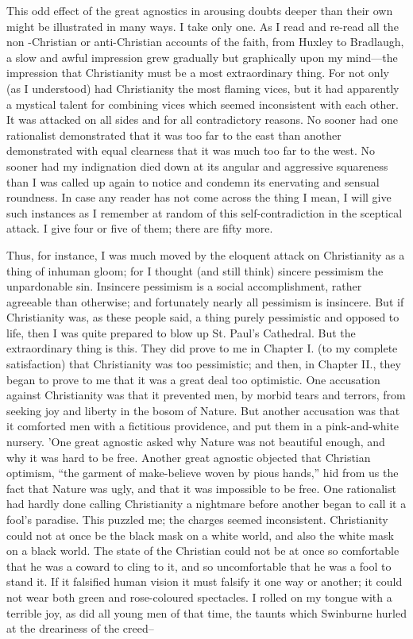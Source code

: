 \documentclass{book}
\begin{document}
This odd effect of the great agnostics in arousing doubts deeper than their own might be illustrated in many ways. I take only one. As I read and re-read all the non -Christian or anti-Christian accounts of the faith, from Huxley to Bradlaugh, a slow and awful impression grew gradually but graphically upon my mind—the impression that Christianity must be a most extraordinary thing. For not only (as I understood) had Christianity the most flaming vices, but it had apparently a mystical talent for combining vices which seemed inconsistent with each other. It was attacked on all sides and for all contradictory reasons. No sooner had one rationalist demonstrated that it was too far to the east than another demonstrated with equal clearness that it was much too far to the west. No sooner had my indignation died down at its angular and aggressive squareness than I was called up again to notice and condemn its enervating and sensual roundness. In case any reader has not come across the thing I mean, I will give such instances as I remember at random of this self-contradiction in the sceptical attack. I give four or five of them; there are fifty more.

Thus, for instance, I was much moved by the eloquent attack on Christianity as a thing of inhuman gloom; for I thought (and still think) sincere pessimism the unpardonable sin. Insincere pessimism is a social accomplishment, rather agreeable than otherwise; and fortunately nearly all pessimism is insincere. But if Christianity was, as these people said, a thing purely pessimistic and opposed to life, then I was quite prepared to blow up St. Paul’s Cathedral. But the extraordinary thing is this. They did prove to me in Chapter I. (to my complete satisfaction) that Christianity was too pessimistic; and then, in Chapter II., they began to prove to me that it was a great deal too optimistic. One accusation against Christianity was that it prevented men, by morbid tears and terrors, from seeking joy and liberty in the bosom of Nature. But another accusation was that it comforted men with a fictitious providence, and put them in a pink-and-white nursery. ’One great agnostic asked why Nature was not beautiful enough, and why it was hard to be free. Another great agnostic objected that Christian optimism, “the garment of make-believe woven by pious hands,” hid from us the fact that Nature was ugly, and that it was impossible to be free. One rationalist had hardly done calling Christianity a nightmare before another began to call it a fool’s paradise. This puzzled me; the charges seemed inconsistent. Christianity could not at once be the black mask on a white world, and also the white mask on a black world. The state of the Christian could not be at once so comfortable that he was a coward to cling to it, and so uncomfortable that he was a fool to stand it. If it falsified human vision it must falsify it one way or another; it could not wear both green and rose-coloured spectacles. I rolled on my tongue with a terrible joy, as did all young men of that time, the taunts which Swinburne hurled at the dreariness of the creed–
\end{document}
